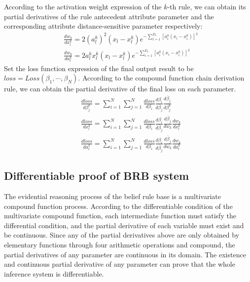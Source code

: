 \documentclass{ieeeaccess}
\begin{document}
According to the activation weight expression of the $k$-th rule, we can obtain its partial derivatives of the rule antecedent attribute parameter and the corresponding attribute distance-sensitive parameter respectively:
\begin{align}
     & \frac{dw_k}{dx_l^k}=2(a_l^k)^2(x_l-x_l^k)e^{-\sum_{i=1}^{T_k}[a_i^k(x_i-x_i^k)]^2}  \\
     & \frac{dw_k}{da_l^k}=2a_l^kx_l^k(x_l-x_l^k)e^{-\sum_{i=1}^{T_k}[a_i^k(x_i-x_i^k)]^2}
\end{align}
Set the loss function expression of the final output result to be $loss=Loss(\beta_1,\cdots,\beta_N)$.
According to the compound function chain derivation rule, we can obtain the partial derivative of the final loss on each parameter.
\begin{align}
     & \frac{dloss}{d\beta_j^k}=\sum_{i=1}^N\sum_{j=1}^N\frac{dloss}{d\beta_i}\frac{d\beta_i}{d\overline{\beta}_j}\frac{d\overline{\beta}_j}{d\beta_j^k}          \\
     & \frac{dloss}{dx_l^k}=\sum_{i=1}^N\sum_{j=1}^N\frac{dloss}{d\beta_i}\frac{d\beta_i}{d\overline{\beta}_j}\frac{d\overline{\beta}_j}{dw_k}\frac{dw_k}{dx_l^k} \\
     & \frac{dloss}{da_l^k}=\sum_{i=1}^N\sum_{j=1}^N\frac{dloss}{d\beta_i}\frac{d\beta_i}{d\overline{\beta}_j}\frac{d\overline{\beta}_j}{dw_k}\frac{dw_k}{da_l^k}
\end{align}

\subsection{Differentiable proof of BRB system}
The evidential reasoning process of the belief rule base is a multivariate compound function process. According to the differentiable condition of the multivariate compound function, each intermediate function must satisfy the differential condition,
and the partial derivative of each variable must exist and be continuous.
Since any of the partial derivatives above are only obtained by elementary functions through four arithmetic operations and compound,
the partial derivatives of any parameter are continuous in its domain.
The existence and continuous partial derivative of any parameter can prove that the whole inference system is differentiable.
\end{document}
